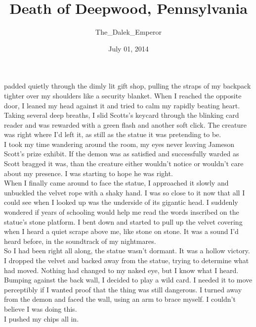 \documentclass[a5paper]{scrartcl}
\title{Death of Deepwood, Pennsylvania}
\author{The\_Dalek\_Emperor}
\date{July 01, 2014}
\begin{document}
\maketitle

 padded quietly through the dimly lit gift shop, pulling the straps of my backpack tighter over my shoulders like a security blanket. When I reached the opposite door, I leaned my head against it and tried to calm my rapidly beating heart. \\


Taking several deep breaths, I slid Scotts's keycard through the blinking card reader and was rewarded with a green flash and another soft click. The creature was right where I'd left it, as still as the statue it was pretending to be. \\


I took my time wandering around the room, my eyes never leaving Jameson Scott's prize exhibit. If the demon was as satisfied and successfully warded as Scott bragged it was, than the creature either wouldn't notice or wouldn't care about my presence.  I was starting to hope he was right. \\


When I finally came around to face the statue, I approached it slowly and unbuckled the velvet rope with a shaky hand. I was so close to it now that all I could see when I looked up was the underside of its gigantic head. I suddenly wondered if years of schooling would help me read the words inscribed on the statue's stone platform. I bent down and started to pull up the velvet covering when I heard a quiet scrape above me, like stone on stone. It was a sound I'd heard before, in the soundtrack of my nightmares.\\


So I had been right all along, the statue wasn't dormant. It was a hollow victory. I dropped the velvet and backed away from the statue, trying to determine what had moved. Nothing had changed to my naked eye, but I know what I heard.\\


Bumping against the back wall, I decided to play a wild card. I needed it to move perceptibly if I wanted proof that the thing was still dangerous. I turned away from the demon and faced the wall, using an arm to brace myself. I couldn't believe I was doing this.\\


I pushed my chips all in. \\
\end{document}
